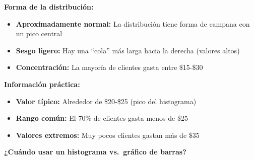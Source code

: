 \documentclass[
  spanish,
  letterpaper,
  DIV=11,
  numbers=noendperiod]{scrreprt}
\providecommand{\tightlist}{%
  \setlength{\itemsep}{0pt}\setlength{\parskip}{0pt}}
\begin{document}
\begin{tcolorbox}[enhanced jigsaw, arc=.35mm, leftrule=.75mm, colbacktitle=quarto-callout-note-color!10!white, left=2mm, opacitybacktitle=0.6, toptitle=1mm, title=\textcolor{quarto-callout-note-color}{\faInfo}\hspace{0.5em}{Interpretación del histograma}, colframe=quarto-callout-note-color-frame, toprule=.15mm, colback=white, rightrule=.15mm, opacityback=0, coltitle=black, breakable, bottomtitle=1mm, titlerule=0mm, bottomrule=.15mm]

\textbf{Forma de la distribución:}

\begin{itemize}
\tightlist
\item
  \textbf{Aproximadamente normal:} La distribución tiene forma de
  campana con un pico central
\item
  \textbf{Sesgo ligero:} Hay una ``cola'' más larga hacia la derecha
  (valores altos)
\item
  \textbf{Concentración:} La mayoría de clientes gasta entre \$15-\$30
\end{itemize}

\textbf{Información práctica:}

\begin{itemize}
\tightlist
\item
  \textbf{Valor típico:} Alrededor de \$20-\$25 (pico del histograma)
\item
  \textbf{Rango común:} El 70\% de clientes gasta menos de \$25
\item
  \textbf{Valores extremos:} Muy pocos clientes gastan más de \$35
\end{itemize}

\end{tcolorbox}

\textbf{¿Cuándo usar un histograma vs.~gráfico de barras?}
\end{document}
